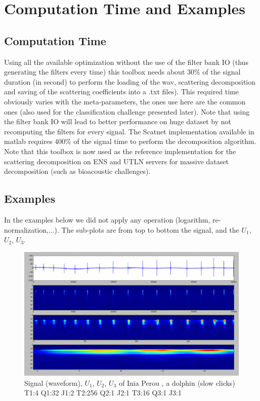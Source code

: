 \documentclass[a4paper]{report}
\begin{document}
\section{Computation Time and Examples}
\subsection{Computation Time}

Using all the available optimization without the use of the filter bank IO (thus generating the filters every time) this toolbox needs about $30\%$ of the signal duration (in second) to perform the loading of the wav, scattering decomposition and saving of the scattering coefficients into a .txt files). This required time obviously varies with the meta-parameters, the ones use here are the common ones (also used for the classification challenge presented later).
Note that using the filter bank IO will lead to better performance on huge dataset by not recomputing the filters for every signal.
The Scatnet implementation available in matlab requires $400\%$ of the signal time to perform the decomposition algorithm.
\\
Note that this toolbox is now used as the reference implementation for the scattering decomposition on ENS and UTLN servers for massive dataset decomposition (such as bioacoustic challenges). 
\subsection{Examples}
In the examples below we did not apply any operation (logarithm, re-normalization,...). The sub-plots are from top to bottom the
signal, and the $U_1$, $U_2$, $U_3$.
\begin{figure}[H]
\begin{center}
\includegraphics[scale=0.21]{slow.png}\caption{Signal (waveform), $U_1$, $U_2$, $U_3$ of Inia Perou \cite{trone2015}, a dolphin (slow clicks) T1:4 Q1:32 J1:2 T2:256 Q2:1 J2:1 T3:16 Q3:1 J3:1}
\end{center}
\end{figure}
\end{document}
